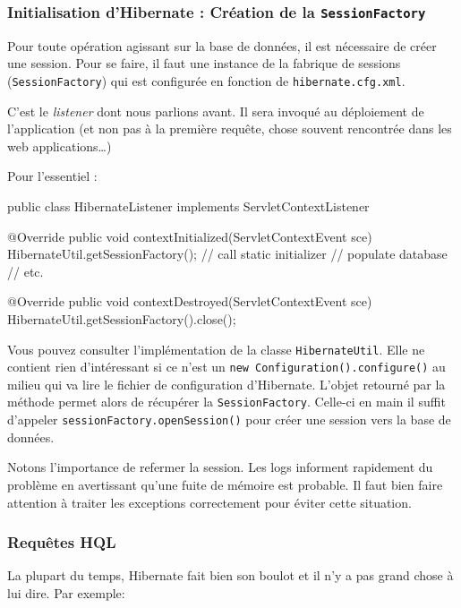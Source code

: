 \cprotect\subsubsection{Initialisation d'Hibernate : Création de la \verb|SessionFactory|}

Pour toute opération agissant sur la base de données, il est nécessaire de créer une session.
Pour se faire, il faut une instance de la fabrique de sessions (\verb|SessionFactory|) qui 
est configurée en fonction de \verb|hibernate.cfg.xml|.

C'est le \emph{listener} dont nous parlions avant. Il sera invoqué au déploiement de l'application
(et non pas à la première requête, chose souvent rencontrée dans les web applications\dots)

Pour l'essentiel :

\begin{javacode}
public class HibernateListener implements ServletContextListener {

    @Override
    public void contextInitialized(ServletContextEvent sce) {
        HibernateUtil.getSessionFactory();  // call static initializer
        // populate database
        // etc.
    }

    @Override
    public void contextDestroyed(ServletContextEvent sce) {
        HibernateUtil.getSessionFactory().close();
    }
}
\end{javacode}

Vous pouvez consulter l'implémentation de la classe \verb|HibernateUtil|. Elle ne contient rien d'intéressant
si ce n'est un \verb|new Configuration().configure()| au milieu qui va lire le fichier de configuration
d'Hibernate. L'objet retourné par la méthode permet alors de récupérer la \verb|SessionFactory|.
Celle-ci en main il suffit d'appeler \verb|sessionFactory.openSession()| pour créer une session vers la 
base de données.

Notons l'importance de refermer la session. Les logs informent rapidement du problème en avertissant
qu'une fuite de mémoire est probable. Il faut bien faire attention à traiter les exceptions correctement
pour éviter cette situation.

\subsubsection{Requêtes HQL}

La plupart du temps, Hibernate fait bien son boulot et il n'y a pas grand chose à lui dire. Par exemple:

